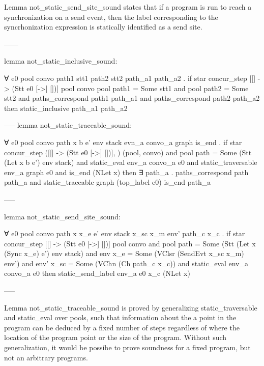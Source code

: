 Lemma not_static_send_site_sound states that if a program is run to reach a synchronization on
a send event, then the label corresponding to the syncrhonization expression is statically
identified as a send site.

------

lemma not_static_inclusive_sound:

∀ e0 pool convo path1 stt1 path2 stt2 path_a1 path_a2 . 
  if
    star concur_step [[] -> (Stt e0 [->] [])] {} pool convo
    pool path1 = Some stt1 and 
    pool path2 = Some stt2 and 
    paths_correspond path1 path_a1 and 
    paths_correspond path2 path_a2
  then
    static_inclusive path_a1 path_a2

-----
lemma not_static_traceable_sound:

∀ e0 pool convo path x b e' env stack evn_a convo_a graph is_end .
  if
    star concur_step ([[] -> (Stt e0 [->] [])], {}) (pool, convo) and 
    pool path = Some (Stt (Let x b e') env stack) and 
    static_eval env_a convo_a e0 and 
    static_traversable env_a graph e0 and 
    is_end (NLet x)
  then
    ∃ path_a . 
      paths_correspond path path_a and 
      static_traceable graph (top_label e0) is_end path_a

-----

lemma not_static_send_site_sound:

∀ e0 pool convo path x x_e e' env stack x_sc x_m env' path_c x_c .
  if
    star concur_step [[] -> (Stt e0 [->] [])] {} pool convo and 
    pool path = Some (Stt (Let x (Sync x_e) e') env stack) and 
    env x_e = Some (VClsr (SendEvt x_sc x_m) env') and 
    env' x_sc = Some (VChn (Ch path_c x_c)) and 
    static_eval env_a convo_a e0
  then 
    static_send_label env_a e0 x_c (NLet x)

-----

Lemma not_static_traceable_sound is proved by generalizing static_traversable and static_eval
over pools, such that information about the a point in the program can be deduced by a fixed
number of steps regardless of where the location of the program point or the size of the
program.  Without such generalization, it would be possibe to prove soundness for a fixed
program, but not an arbitrary programs.

